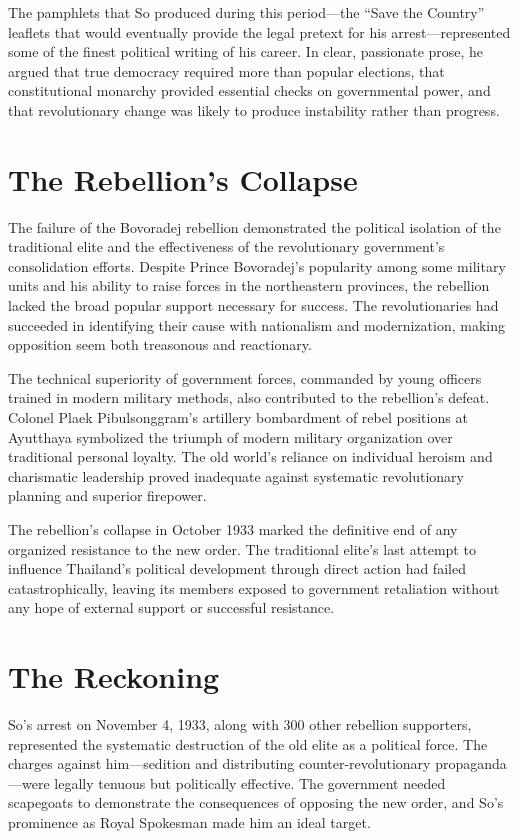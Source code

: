 \documentclass[
  Letterpaper,
]{scrbook}
\begin{document}
The pamphlets that So produced during this period---the ``Save the
Country'' leaflets that would eventually provide the legal pretext for
his arrest---represented some of the finest political writing of his
career. In clear, passionate prose, he argued that true democracy
required more than popular elections, that constitutional monarchy
provided essential checks on governmental power, and that revolutionary
change was likely to produce instability rather than progress.

\section{The Rebellion's Collapse}\label{the-rebellions-collapse}

The failure of the Bovoradej rebellion demonstrated the political
isolation of the traditional elite and the effectiveness of the
revolutionary government's consolidation efforts. Despite Prince
Bovoradej's popularity among some military units and his ability to
raise forces in the northeastern provinces, the rebellion lacked the
broad popular support necessary for success. The revolutionaries had
succeeded in identifying their cause with nationalism and modernization,
making opposition seem both treasonous and reactionary.

The technical superiority of government forces, commanded by young
officers trained in modern military methods, also contributed to the
rebellion's defeat. Colonel Plaek Pibulsonggram's artillery bombardment
of rebel positions at Ayutthaya symbolized the triumph of modern
military organization over traditional personal loyalty. The old world's
reliance on individual heroism and charismatic leadership proved
inadequate against systematic revolutionary planning and superior
firepower.

The rebellion's collapse in October 1933 marked the definitive end of
any organized resistance to the new order. The traditional elite's last
attempt to influence Thailand's political development through direct
action had failed catastrophically, leaving its members exposed to
government retaliation without any hope of external support or
successful resistance.

\section{The Reckoning}\label{the-reckoning}

So's arrest on November 4, 1933, along with 300 other rebellion
supporters, represented the systematic destruction of the old elite as a
political force. The charges against him---sedition and distributing
counter-revolutionary propaganda---were legally tenuous but politically
effective. The government needed scapegoats to demonstrate the
consequences of opposing the new order, and So's prominence as Royal
Spokesman made him an ideal target.
\end{document}
